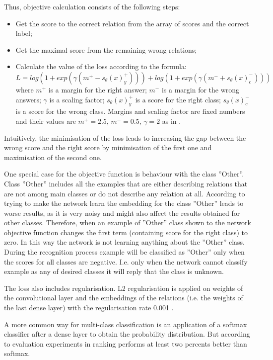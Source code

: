 Thus, objective calculation consists 
of the following steps:
\begin{itemize}
  \item Get the score to the correct relation from the array of scores and the correct label;
  \item Get the maximal score from the remaining wrong relations;
  \item Calculate the value of the loss according to the formula:
  $$L = log(1 + exp(\gamma(m^+ - s_{\theta}(x)_y^+))) + log(1 + exp(\gamma(m^- + s_{\theta}(x)_c^-)))$$
where $m^+$ is a margin for the right answer; $m^-$ is a margin for the wrong answers; $\gamma$ is a scaling factor; $s_{\theta}(x)_y^+$ is a score for the right class; $s_{\theta}(x)_c^-$ is a score for the wrong class. Margins and scaling factor are fixed numbers and their values are 
$m^+=2.5$, $m^-=0.5$, $\gamma=2$ as in \cite{DBLP:journals/corr/SantosXZ15}.
\end{itemize}

Intuitively, the minimisation of the loss leads to increasing the gap between the wrong score and 
the right
score by minimisation of the first one and maximisation of the second one. 

One special case for the objective function is behaviour with the class ''Other''. Class ''Other'' 
includes all the examples that are either describing relations that are not among main classes 
or do not describe any relation at all. According to \cite{DBLP:journals/corr/SantosXZ15} trying to make the network learn the 
embedding for the class ''Other'' leads to worse results, as it is very noisy and might also 
affect the results obtained for other classes. Therefore, when an example of ''Other'' class shown 
to the network objective function changes the first term (containing score for the right class) to 
zero. In this way the network is not learning anything about the ''Other'' class. During the 
recognition process example will be classified as ''Other'' only when the scores for all classes are 
negative. I.e. only when the network cannot classify example as any of desired classes it will reply 
that the class is unknown.

The loss also includes regularisation. L2 regularisation is applied on weights of the convolutional 
layer and the embeddings of the
relations (i.e. the weights of the last dense layer) with the regularisation rate 0.001 \cite{DBLP:journals/corr/SantosXZ15}.

A more common way for multi-class classification is an application of a softmax classifier after a 
dense layer to obtain the probability distribution. But according to evaluation experiments  in 
\cite{DBLP:journals/corr/SantosXZ15} ranking performs at least two percents better than softmax.

